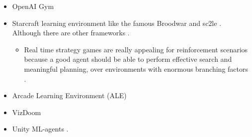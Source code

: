 
\begin{itemize}
\item OpenAI Gym \citep{Brockman2016}
\item Starcraft learning environment like the famous Broodwar \citep{Broodwar} and sc2le \citep{Vinyals2017}. Although there are other frameworks \citep{Synnaeve2016}.
    \begin{itemize}
    \item Real time strategy games are really appealing for reinforcement scenarios because a good agent should be able to perform effective search and meaningful planning, over environments with enormous branching factors \citep{Soemers2014}\citep{Wender2012}. 
    \end{itemize}
\item Arcade Learning Environment (ALE) \citep{Bellemare2015}
\item VizDoom \citep{Kempka2017}
\item Unity ML-agents \citep{UnityMLAgents}.
\end{itemize}
